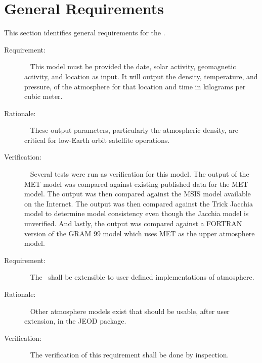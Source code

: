 \section{General Requirements}\label{sec:general_reqts}

This section identifies general requirements for the \atmosphereDesc.


\label{reqt:met_atmosphere}
\begin{description}
  \item[Requirement:]\ \newline
This model must be provided the date, solar activity, geomagnetic activity, and
location as input. It will output the density, temperature, and pressure,
of the atmosphere for that location and time in kilograms per cubic meter.
  \item[Rationale:]\ \newline
    These output parameters, particularly the atmospheric density, are critical
    for low-Earth orbit satellite operations.
  \item[Verification:]\ \newline
    Several tests were run as verification for this model.  The output of the
    MET model was compared against existing published data for the MET model.
    The output was then compared against the MSIS model \cite{MSISwebsite} available on the
    Internet.  The output was then compared against the Trick Jacchia model
    to determine model consistency even though the Jacchia model is unverified.
    And lastly, the output was compared against a FORTRAN version of the GRAM
    99 model which uses MET as the upper atmosphere model.
\end{description}

\label{reqt:atmos_extension}
\begin{description}
\item[Requirement:]\ \newline
The \atmosphereDesc\ shall be extensible to user defined implementations
of atmosphere.
\item[Rationale:]\ \newline
Other atmosphere models exist that should be usable, after user extension,
in the JEOD package.
\item[Verification:]\ \newline
The verification of this requirement shall be done by inspection.
\end{description}

